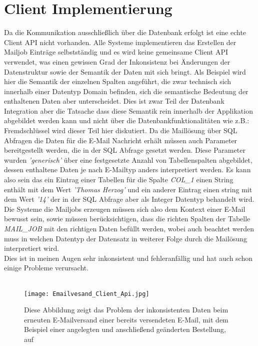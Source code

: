 \chapter{Client Implementierung}
\label{cha:client-api}
Da die Kommunikation ausschließlich über die Datenbank erfolgt ist eine echte Client API nicht vorhanden. Alle Systeme implementieren das Erstellen der Mailjob Einträge selbstständig und es wird keine gemeinsame Client API verwendet, was einen gewissen Grad der Inkonsistenz bei Änderungen der Datenstruktur sowie der Semantik der Daten mit sich bringt. Als Beispiel wird hier die Semantik der einzelnen Spalten angeführt, die zwar technisch sich innerhalb einer Datentyp Domain befinden, sich die semantische Bedeutung der enthaltenen Daten aber unterscheidet. Dies ist zwar Teil der Datenbank Integration aber die Tatsache dass diese Semantik rein innerhalb der Applikation abgebildet werden kann und nicht über die Datenbankfunktionalitäten wie z.B.: Fremdschlüssel wird dieser Teil hier diskutiert. Da die Maillösung über SQL Abfragen die Daten für die E-Mail Nachricht erhält müssen auch Parameter bereitgestellt werden, die in der SQL Abfrage gesetzt werden. Diese Parameter wurden \emph{'generisch'} über eine festgesetzte Anzahl von Tabellenspalten abgebildet, dessen enthaltene Daten je nach E-Mailtyp anders interpretiert werden. Es kann also sein das ein Eintrag einer Tabellen für die Spalte \emph{COL\_1} einen String enthält mit dem Wert \emph{'Thomas Herzog'} und ein anderer Eintrag einen string mit dem Wert \emph{'14'} der in der SQL Abfrage aber als Integer Datentyp behandelt wird. Die Systeme die Mailjobs erzeugen müssen sich also dem Kontext einer E-Mail bewusst sein, sowie müssen berücksichtigen, dass die richten Spalten der Tabelle \emph{MAIL\_JOB} mit den richtigen Daten befüllt werden, wobei auch beachtet werden muss in welchen Datentyp der Datensatz in weiterer Folge durch die Mailösung interpretiert wird.\\
Dies ist in meinen Augen sehr inkonsistent und fehleranfällig und hat auch schon einige Probleme verursacht.\\\\
\begin{figure}[h]
\centering
\texttt{[image: Emailvesand\_Client\_Api.jpg]}
\caption{Diese Abbildung zeigt das Problem der inkonsistenten Daten beim erneuten E-Mailversand einer bereits versendeten E-Mail, mit dem Beispiel einer angelegten und anschließend geänderten Bestellung, auf}
\label{fig:sequence-diagram-mail-send}
\end{figure}
\newpage
